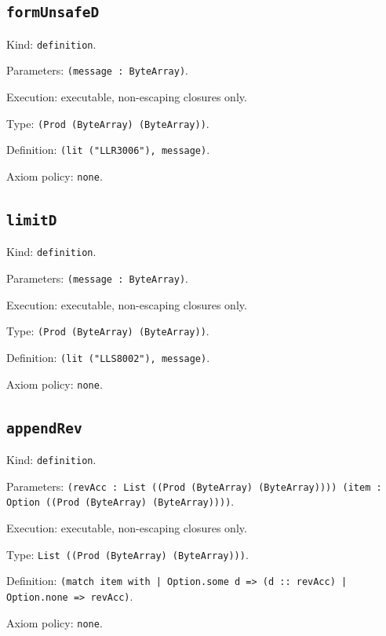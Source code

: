 \documentclass[11pt]{article}
\begin{document}
\subsection*{\texttt{formUnsafeD}}
\noindent Kind: \texttt{definition}.\par
\noindent Parameters: \texttt{(message : ByteArray)}.\par
\noindent Execution: executable, non-escaping closures only.\par
\noindent Type: \texttt{(Prod (ByteArray) (ByteArray))}.\par
\noindent Definition: \texttt{(lit ("LLR3006"), message)}.\par
\noindent Axiom policy: \texttt{none}.\par
\subsection*{\texttt{limitD}}
\noindent Kind: \texttt{definition}.\par
\noindent Parameters: \texttt{(message : ByteArray)}.\par
\noindent Execution: executable, non-escaping closures only.\par
\noindent Type: \texttt{(Prod (ByteArray) (ByteArray))}.\par
\noindent Definition: \texttt{(lit ("LLS8002"), message)}.\par
\noindent Axiom policy: \texttt{none}.\par
\subsection*{\texttt{appendRev}}
\noindent Kind: \texttt{definition}.\par
\noindent Parameters: \texttt{(revAcc : List ((Prod (ByteArray) (ByteArray)))) (item : Option ((Prod (ByteArray) (ByteArray))))}.\par
\noindent Execution: executable, non-escaping closures only.\par
\noindent Type: \texttt{List ((Prod (ByteArray) (ByteArray)))}.\par
\noindent Definition: \texttt{(match item with | Option.some d => (d :: revAcc) | Option.none => revAcc)}.\par
\noindent Axiom policy: \texttt{none}.\par
\end{document}
